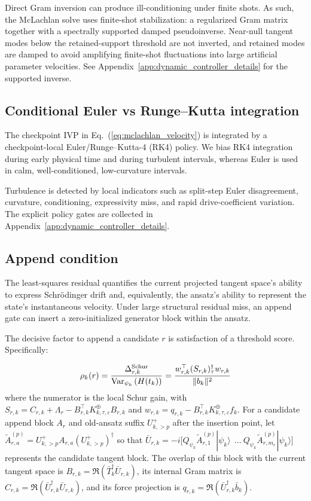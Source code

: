 \documentclass[
  reprint,
  amsmath,
  amssymb,
  aps,
  pra,
  nofootinbib,
  superscriptaddress,
  floatfix
]{revtex4-2}
\newcommand{\eps}{\varepsilon}
\newcommand{\ket}[1]{|#1\rangle}
\begin{document}
Direct Gram inversion can produce ill-conditioning under finite shots. As such, the McLachlan solve uses finite-shot stabilization: a regularized Gram matrix together with a spectrally supported damped pseudoinverse. Near-null tangent modes below the retained-support threshold are not inverted, and retained modes are damped to avoid amplifying finite-shot fluctuations into large artificial parameter velocities. See Appendix~\ref{app:dynamic_controller_details} for the supported inverse.

\subsection{Conditional Euler vs Runge--Kutta integration}

The checkpoint IVP in Eq.~(\ref{eq:mclachlan_velocity}) is integrated by a checkpoint-local Euler/Runge--Kutta-4 (RK4) policy. We bias RK4 integration during early physical time and during turbulent intervals, whereas Euler is used in calm, well-conditioned, low-curvature intervals.

Turbulence is detected by local indicators such as split-step Euler disagreement, curvature, conditioning, expressivity miss, and rapid drive-coefficient variation.  The explicit policy gates are collected in Appendix~\ref{app:dynamic_controller_details}.

\subsection{Append condition}
The least-squares residual quantifies the current projected tangent space's ability to express Schrödinger drift and, equivalently, the ansatz's ability to represent the state's instantaneous velocity. Under large structural residual miss, an append gate can insert a zero-initialized generator block within the ansatz.

The decisive factor to append a candidate $r$ is satisfaction of a threshold score. Specifically:

\begin{equation}
    \rho_k(r)=\frac{\Delta_{r,k}^{\rm Schur}}{\operatorname{Var}_{\psi_k}\left(H(t_k)\right)}=\frac{w_{r,k}^\top (S_{r,k})_{\tau}^{\dagger}w_{r,k}}{\|b_k\|^2}
\end{equation}
where the numerator is the local Schur gain, with $S_{r,k}=C_{r,k}+\Lambda_r-B_{r,k}^\top K_{k,\tau,\eps}^{\oplus}B_{r,k}$ and $w_{r,k}=q_{r,k}-B_{r,k}^\top K_{k,\tau,\eps}^{\oplus}f_k$. For a candidate append block $A_r$ and old-ansatz suffix $U_{k,>p}^{+}$ after the insertion point, let $\widetilde A_{r,a}^{(p)}=U_{k,>p}^{+}A_{r,a}(U_{k,>p}^{+})^\dagger$ so that $\bar U_{r,k}
=-i\bigl[
 Q_{\psi_k}\widetilde A_{r,1}^{(p)}\ket{\psi_k}\ ~...~
 Q_{\psi_k}\widetilde A_{r,m_r}^{(p)}\ket{\psi_k}
\bigr]$ represents the candidate tangent block. The overlap of this block with the current tangent space is $B_{r,k}=\Re(\bar T_k^\dagger\bar U_{r,k})$, its internal Gram matrix is $C_{r,k}=\Re(\bar U_{r,k}^\dagger\bar U_{r,k})$, and its force projection is $q_{r,k}=\Re(\bar U_{r,k}^\dagger\bar b_k)$.
\end{document}
